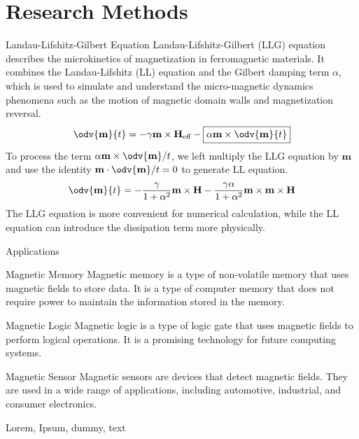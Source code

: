 \documentclass[ mode = beamer, handout ]{hduthesis}
\begin{document}
\maketitle

\section{Research Methods}

\begin{frame}{Landau-Lifshitz-Gilbert Equation}
  \pause
  Landau-Lifshitz-Gilbert (LLG) equation describes the microkinetics of magnetization in ferromagnetic materials. It combines the Landau-Lifshitz (LL) equation and the Gilbert damping term $\alpha$, which is used to simulate and understand the micro-magnetic dynamics phenomena such as the motion of magnetic domain walls and magnetization reversal.
  \pause
  \begin{equation}
    \odv{\mathbf m}{t} = -\gamma \mathbf m \times \mathbf H_\text{eff} -
    \boxed{\alpha \mathbf m \times \odv{\mathbf m}{t}}
  \end{equation}
  \pause
  To process the term $\alpha \mathbf m \times \odv{\mathbf m}/{t}$,
  we left multiply the LLG equation by $\mathbf m$ and use the identity
  $\mathbf m \cdot \odv{\mathbf m}/{t} = 0$ to generate LL equation.
  \pause
  \begin{equation}
    \odv{\mathbf m}{t} = -\frac{\gamma}{1 + \alpha^2} \mathbf m \times \mathbf H - \frac{\gamma\alpha}{1 + \alpha^2} \mathbf m \times \mathbf m \times \mathbf H
  \end{equation}
  \pause
  \alert{The LLG equation is more convenient for numerical calculation, while the LL equation can introduce the dissipation term more physically.}
\end{frame}

\begin{frame}{Applications}
  \pause
  \begin{block}{Magnetic Memory}
    Magnetic memory is a type of non-volatile memory that uses magnetic fields to store data. It is a type of computer memory that does not require power to maintain the information stored in the memory.
  \end{block}
  \pause
  \begin{exampleblock}{Magnetic Logic}
    Magnetic logic is a type of logic gate that uses magnetic fields to perform logical operations. It is a promising technology for future computing systems.
  \end{exampleblock}
  \pause
  \begin{alertblock}{Magnetic Sensor}
    Magnetic sensors are devices that detect magnetic fields. They are used in a wide range of applications, including automotive, industrial, and consumer electronics.
  \end{alertblock}
  Lorem,
  Ipsum,
  dummy,
  text
  \cite{whole-journal}
  \cite{inbook-crossref,whole-set,booklet-full,incollection-crossref,whole-collection,manual-full,mastersthesis-full}
\end{frame}
\end{document}
